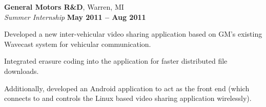 \documentclass[margin,line]{resume}
\begin{document}
\begin{resume}


    \textbf{General Motors R\&D}, Warren, MI\\%
    \textsl{Summer Internship} \hfill \textbf{May 2011 -- Aug 2011}
    \begin{list2}
    \item Developed a new inter-vehicular video sharing application based on GM's existing Wavecast system for vehicular communication.
    \item Integrated erasure coding into the application for faster distributed file downloads. 
    \item Additionally, developed an Android application to act as the front end (which connects to and controls the Linux based video sharing application wirelessly).
    \end{list2}
    


\end{resume}
\end{document}
